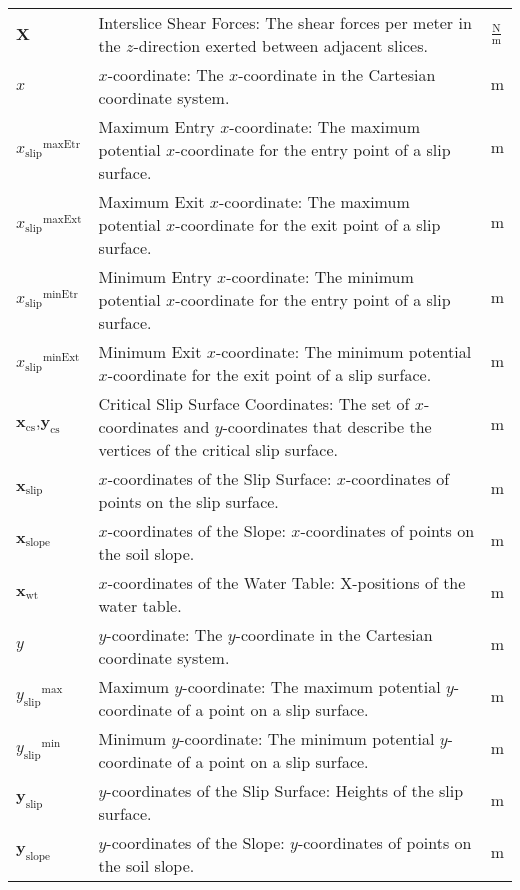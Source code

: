 \documentclass[12pt]{article}
\begin{document}
\begin{longtabu}{l X[l] l}
$\symbf{X}$ & Interslice Shear Forces: The shear forces per meter in the $z$-direction exerted between adjacent slices. & $\frac{\text{N}}{\text{m}}$
\\
$x$ & $x$-coordinate: The $x$-coordinate in the Cartesian coordinate system. & ${\text{m}}$
\\
${{x_{\text{slip}}}^{\text{maxEtr}}}$ & Maximum Entry $x$-coordinate: The maximum potential $x$-coordinate for the entry point of a slip surface. & ${\text{m}}$
\\
${{x_{\text{slip}}}^{\text{maxExt}}}$ & Maximum Exit $x$-coordinate: The maximum potential $x$-coordinate for the exit point of a slip surface. & ${\text{m}}$
\\
${{x_{\text{slip}}}^{\text{minEtr}}}$ & Minimum Entry $x$-coordinate: The minimum potential $x$-coordinate for the entry point of a slip surface. & ${\text{m}}$
\\
${{x_{\text{slip}}}^{\text{minExt}}}$ & Minimum Exit $x$-coordinate: The minimum potential $x$-coordinate for the exit point of a slip surface. & ${\text{m}}$
\\
${\symbf{x}_{\text{cs}}}\text{,}{\symbf{y}_{\text{cs}}}$ & Critical Slip Surface Coordinates: The set of $x$-coordinates and $y$-coordinates that describe the vertices of the critical slip surface. & ${\text{m}}$
\\
${\symbf{x}_{\text{slip}}}$ & $x$-coordinates of the Slip Surface: $x$-coordinates of points on the slip surface. & ${\text{m}}$
\\
${\symbf{x}_{\text{slope}}}$ & $x$-coordinates of the Slope: $x$-coordinates of points on the soil slope. & ${\text{m}}$
\\
${\symbf{x}_{\text{wt}}}$ & $x$-coordinates of the Water Table: X-positions of the water table. & ${\text{m}}$
\\
$y$ & $y$-coordinate: The $y$-coordinate in the Cartesian coordinate system. & ${\text{m}}$
\\
${{y_{\text{slip}}}^{\text{max}}}$ & Maximum $y$-coordinate: The maximum potential $y$-coordinate of a point on a slip surface. & ${\text{m}}$
\\
${{y_{\text{slip}}}^{\text{min}}}$ & Minimum $y$-coordinate: The minimum potential $y$-coordinate of a point on a slip surface. & ${\text{m}}$
\\
${\symbf{y}_{\text{slip}}}$ & $y$-coordinates of the Slip Surface: Heights of the slip surface. & ${\text{m}}$
\\
${\symbf{y}_{\text{slope}}}$ & $y$-coordinates of the Slope: $y$-coordinates of points on the soil slope. & ${\text{m}}$

\end{longtabu}
\end{document}
